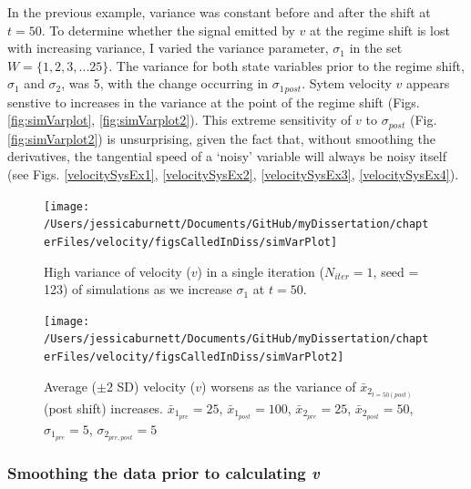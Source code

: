 \documentclass[12pt,twoside,openany]{reedthesis}
\begin{document}
In the previous example, variance was constant before and after the shift at \(t=50\). To determine whether the signal emitted by \(v\) at the regime shift is lost with increasing variance, I varied the variance parameter, \(\sigma_1\) in the set \(W = \{1,2,3,...25 \}\). The variance for both state variables prior to the regime shift, \(\sigma_1\) and \(\sigma_2\), was 5, with the change occurring in \(\sigma_1{_{post}}\). Sytem velocity \(v\) appears senstive to increases in the variance at the point of the regime shift (Figs. \ref{fig:simVarplot}, \ref{fig:simVarplot2}). This extreme sensitivity of \(v\) to \(\sigma{_{post}}\) (Fig. \ref{fig:simVarplot2}) is unsurprising, given the fact that, without smoothing the derivatives, the tangential speed of a `noisy' variable will always be noisy itself (see Figs. \ref{velocitySysEx1}, \ref{velocitySysEx2}, \ref{velocitySysEx3}, \ref{velocitySysEx4}).
\begin{figure}
\texttt{[image: /Users/jessicaburnett/Documents/GitHub/myDissertation/chapterFiles/velocity/figsCalledInDiss/simVarPlot]} \caption{High variance of velocity ($v$) in a single iteration ($N_{iter}=1$, seed = 123) of simulations as we increase $\sigma_1$ at $t=50$.}\label{fig:simVarPlot}
\end{figure}
\begin{figure}
\texttt{[image: /Users/jessicaburnett/Documents/GitHub/myDissertation/chapterFiles/velocity/figsCalledInDiss/simVarPlot2]} \caption{Average ($\pm 2$ SD) velocity ($v$) worsens as the variance of $\bar{x}_{2_{t=50 (post)}}$ (post shift) increases. $\bar{x}_{1_{pre}} = 25$, $\bar{x}_{1_{post}} = 100$, $\bar{x}_{2_{pre}} = 25$, $\bar{x}_{2_{post}} = 50$, $\sigma_{1_{pre}} = 5$, $\sigma_{2_{pre,post}} = 5$}\label{fig:simVarPlot2}
\end{figure}
\hypertarget{smoothing-the-data-prior-to-calculating-v}{%
\subsubsection{\texorpdfstring{Smoothing the data prior to calculating \emph{v}}{Smoothing the data prior to calculating v}}\label{smoothing-the-data-prior-to-calculating-v}}
\end{document}
